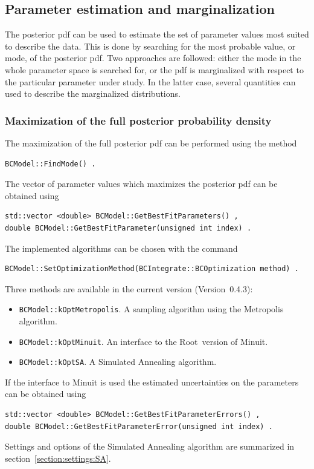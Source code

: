 \documentclass[11pt, a4paper]{article}
\newcommand{\Root}{{\sc Root}}
\newcommand{\versionno}{0.4.3}
\newcommand{\Version}{Version~\versionno}
\begin{document}

\subsection{Parameter estimation and marginalization}

The posterior pdf can be used to estimate the set of parameter values
most suited to describe the data. This is done by searching for the
most probable value, or mode, of the posterior pdf. Two approaches are
followed: either the mode in the whole parameter space is searched
for, or the pdf is marginalized with respect to the particular
parameter under study. In the latter case, several quantities can used
to describe the marginalized distributions.


\subsubsection{Maximization of the full posterior probability density}

The maximization of the full posterior pdf can be performed using the
method
%
\begin{verbatim}
BCModel::FindMode() .
\end{verbatim}

\noindent
The vector of parameter values which maximizes the posterior pdf can be obtained using
%
\begin{verbatim}
std::vector <double> BCModel::GetBestFitParameters() ,
double BCModel::GetBestFitParameter(unsigned int index) .
\end{verbatim}
%
The implemented algorithms can be chosen with the command
%
\begin{verbatim}
BCModel::SetOptimizationMethod(BCIntegrate::BCOptimization method) .
\end{verbatim}
%
Three methods are available in the current version (\Version):
%
\begin{itemize}
\item \verb|BCModel::kOptMetropolis|. A sampling algorithm using the
  Metropolis algorithm.
\item \verb|BCModel::kOptMinuit|. An interface to the \Root\ version
  of Minuit.
\item \verb|BCModel::kOptSA|. A Simulated Annealing algorithm.
\end{itemize}
%
If the interface to Minuit is used the estimated uncertainties on the
parameters can be obtained using
%
\begin{verbatim}
std::vector <double> BCModel::GetBestFitParameterErrors() ,
double BCModel::GetBestFitParameterError(unsigned int index) .
\end{verbatim}
%
Settings and options of the Simulated Annealing algorithm are
summarized in section~\ref{section:settings:SA}. \\
\end{document}
